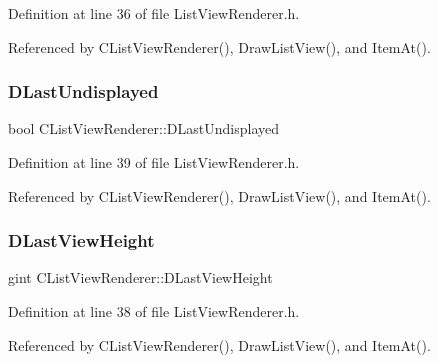 Definition at line 36 of file List\+View\+Renderer.\+h.



Referenced by C\+List\+View\+Renderer(), Draw\+List\+View(), and Item\+At().

\hypertarget{classCListViewRenderer_ad08a63dfe697395050c5af2ce4479aa2}{}\label{classCListViewRenderer_ad08a63dfe697395050c5af2ce4479aa2} 
\subsubsection{\texorpdfstring{D\+Last\+Undisplayed}{DLastUndisplayed}}
{\footnotesize\ttfamily bool C\+List\+View\+Renderer\+::\+D\+Last\+Undisplayed\hspace{0.3cm}{\ttfamily [protected]}}



Definition at line 39 of file List\+View\+Renderer.\+h.



Referenced by C\+List\+View\+Renderer(), Draw\+List\+View(), and Item\+At().

\hypertarget{classCListViewRenderer_a7f74a3883638efee557cde501d47ee70}{}\label{classCListViewRenderer_a7f74a3883638efee557cde501d47ee70} 
\subsubsection{\texorpdfstring{D\+Last\+View\+Height}{DLastViewHeight}}
{\footnotesize\ttfamily gint C\+List\+View\+Renderer\+::\+D\+Last\+View\+Height\hspace{0.3cm}{\ttfamily [protected]}}



Definition at line 38 of file List\+View\+Renderer.\+h.



Referenced by C\+List\+View\+Renderer(), Draw\+List\+View(), and Item\+At().

\hypertarget{classCListViewRenderer_ad88d5d0b8209dd9ae1cf726f99339640}{}\label{classCListViewRenderer_ad88d5d0b8209dd9ae1cf726f99339640} 

